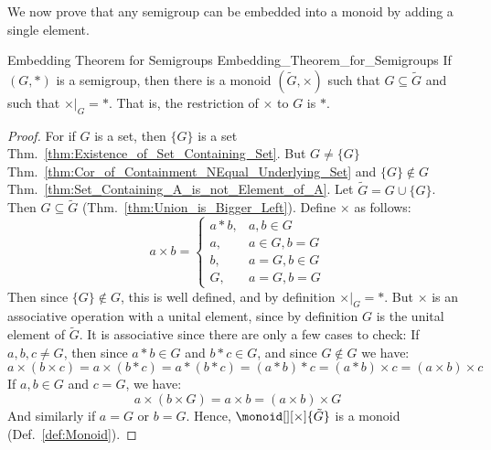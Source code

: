         We now prove that any semigroup can be embedded into a monoid by adding
        a single element.
        \begin{ltheorem}{Embedding Theorem for Semigroups}
                        {Embedding_Theorem_for_Semigroups}
            If $(G,*)$ is a semigroup, then there is a monoid
            $(\tilde{G},\times)$ such that $G\subseteq\tilde{G}$ and such that
            $\times|_{G}=*$. That is, the restriction of $\times$ to $G$ is $*$.
        \end{ltheorem}
        \begin{proof}
            For if $G$ is a set, then $\{G\}$ is a set
            Thm.~\ref{thm:Existence_of_Set_Containing_Set}. But $G\ne\{G\}$
            Thm.~\ref{thm:Cor_of_Containment_NEqual_Underlying_Set} and
            $\{G\}\notin{G}$
            Thm.~\ref{thm:Set_Containing_A_is_not_Element_of_A}. Let
            $\tilde{G}=G\cup\{G\}$. Then $G\subseteq\tilde{G}$
            (Thm.~\ref{thm:Union_is_Bigger_Left}). Define $\times$ as follows:
            \begin{equation}
                a\times{b}=
                \begin{cases}
                    a*b,&a,b\in{G}\\
                    a,&a\in{G},b=G\\
                    b,&a=G,b\in{G}\\
                    G,&a=G,b=G
                \end{cases}
            \end{equation}
            Then since $\{G\}\notin{G}$, this is well defined, and by definition
            $\times|_{G}=*$. But $\times$ is an associative operation with a
            unital element, since by definition $G$ is the unital element of
            $\tilde{G}$. It is associative since there are only a few cases to
            check: If $a,b,c\ne{G}$, then since $a*b\in{G}$ and $b*c\in{G}$, and
            since $G\notin{G}$ we have:
            \begin{equation}
                a\times(b\times{c})=a\times(b*c)=a*(b*c)=(a*b)*c=
                (a*b)\times{c}=(a\times{b})\times{c}
            \end{equation}
            If $a,b\in{G}$ and $c=G$, we have:
            \begin{equation}
                a\times(b\times{G})=a\times{b}=(a\times{b})\times{G}
            \end{equation}
            And similarly if $a=G$ or $b=G$. Hence,
            $\monoid[][\times]{\tilde{G}}$ is a monoid (Def.~\ref{def:Monoid}).
        \end{proof}
